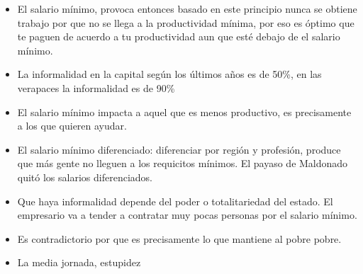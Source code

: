 \begin{itemize}
    \item El salario mínimo, provoca entonces basado en este principio nunca se obtiene trabajo por que no se llega a la productividad mínima, por eso es óptimo que te paguen de acuerdo a tu productividad aun que esté debajo de el salario mínimo.
    \item La informalidad en la capital según los últimos años es de 50\%, en las verapaces la informalidad es de 90\%
    \item El salario mínimo impacta a aquel que es menos productivo, es precisamente a los que quieren ayudar.
    \item El salario mínimo diferenciado: diferenciar por región y profesión, produce que más gente no lleguen a los requicitos mínimos. El payaso de Maldonado quitó los salarios diferenciados. 
    \item Que haya informalidad depende del poder o totalitariedad del estado. El empresario va a tender a contratar muy pocas personas por el salario mínimo.
    \item Es contradictorio por que es precisamente lo que mantiene al pobre pobre.
    \item La media jornada, estupidez
\end{itemize}
